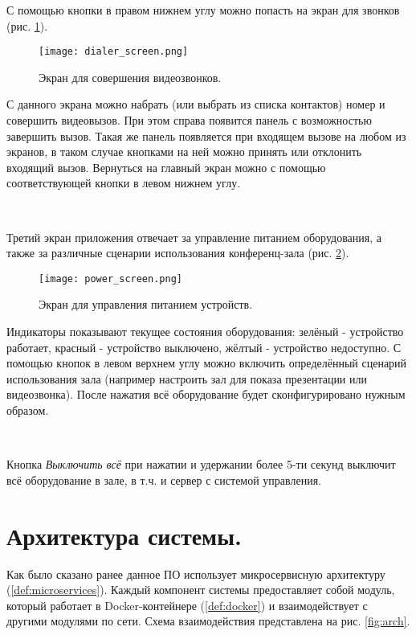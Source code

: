 \noindent С помощью кнопки в правом нижнем углу можно попасть на экран для звонков (рис. \ref{fig:dialer_screen}).

\begin{figure}[h]
    \centering
    \texttt{[image: dialer\_screen.png]}
    \caption{Экран для совершения видеозвонков.}
    \label{fig:dialer_screen}
\end{figure}

\noindent С данного экрана можно набрать (или выбрать из списка контактов) номер и совершить видеовызов. При этом справа
появится панель с возможностью завершить вызов. Такая же панель появляется при входящем вызове на любом из экранов,
в таком случае кнопками на ней можно принять или отклонить входящий вызов. Вернуться на главный экран можно с помощью
соответствующей кнопки в левом нижнем углу.

~\

\noindent Третий экран приложения отвечает за управление питанием оборудования, а также за различные сценарии использования
конференц-зала (рис. \ref{fig:power_screen}).

\begin{figure}[h]
    \centering
    \texttt{[image: power\_screen.png]}
    \caption{Экран для управления питанием устройств.}
    \label{fig:power_screen}
\end{figure}

\noindent Индикаторы показывают текущее состояния оборудования: зелёный - устройство работает, красный - устройство
выключено, жёлтый - устройство недоступно. С помощью кнопок в левом верхнем углу можно включить определённый сценарий
использования зала (например настроить зал для показа презентации или видеозвонка). После нажатия всё оборудование
будет сконфигурировано нужным образом.

~\

\noindent Кнопка \textit{Выключить всё} при нажатии и удержании более 5-ти секунд выключит всё оборудование в зале, в т.ч.
и сервер с системой управления.

\clearpage

\section{Архитектура системы.}

Как было сказано ранее данное ПО использует микросервисную архитектуру (\ref{def:microservices}). Каждый компонент системы
предоставляет собой модуль, который работает в Docker-контейнере (\ref{def:docker}) и взаимодействует с другими модулями
по сети. Схема взаимодействия представлена на рис. \ref{fig:arch}.

